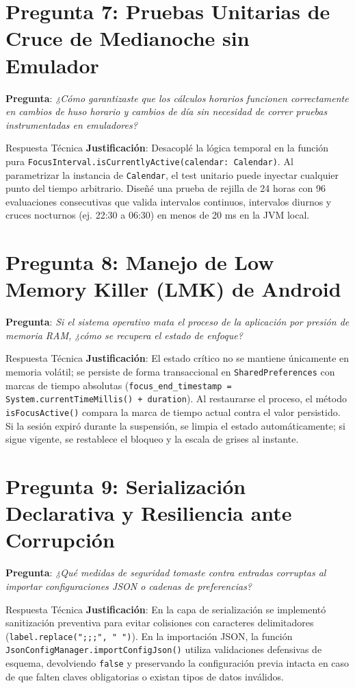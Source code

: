 \documentclass[11pt,a4paper,oneside]{report}
\begin{document}
\section{Pregunta 7: Pruebas Unitarias de Cruce de Medianoche sin Emulador}
\textbf{Pregunta}: \textit{¿Cómo garantizaste que los cálculos horarios funcionen correctamente en cambios de huso horario y cambios de día sin necesidad de correr pruebas instrumentadas en emuladores?}
\begin{starbox}{Respuesta Técnica}
\textbf{Justificación}: Desacoplé la lógica temporal en la función pura \texttt{FocusInterval.isCurrentlyActive(calendar: Calendar)}. Al parametrizar la instancia de \texttt{Calendar}, el test unitario puede inyectar cualquier punto del tiempo arbitrario. Diseñé una prueba de rejilla de 24 horas con 96 evaluaciones consecutivas que valida intervalos continuos, intervalos diurnos y cruces nocturnos (ej. 22:30 a 06:30) en menos de 20 ms en la JVM local.
\end{starbox}

\section{Pregunta 8: Manejo de Low Memory Killer (LMK) de Android}
\textbf{Pregunta}: \textit{Si el sistema operativo mata el proceso de la aplicación por presión de memoria RAM, ¿cómo se recupera el estado de enfoque?}
\begin{starbox}{Respuesta Técnica}
\textbf{Justificación}: El estado crítico no se mantiene únicamente en memoria volátil; se persiste de forma transaccional en \texttt{SharedPreferences} con marcas de tiempo absolutas (\texttt{focus\_end\_timestamp = System.currentTimeMillis() + duration}). Al restaurarse el proceso, el método \texttt{isFocusActive()} compara la marca de tiempo actual contra el valor persistido. Si la sesión expiró durante la suspensión, se limpia el estado automáticamente; si sigue vigente, se restablece el bloqueo y la escala de grises al instante.
\end{starbox}

\section{Pregunta 9: Serialización Declarativa y Resiliencia ante Corrupción}
\textbf{Pregunta}: \textit{¿Qué medidas de seguridad tomaste contra entradas corruptas al importar configuraciones JSON o cadenas de preferencias?}
\begin{starbox}{Respuesta Técnica}
\textbf{Justificación}: En la capa de serialización se implementó sanitización preventiva para evitar colisiones con caracteres delimitadores (\texttt{label.replace(";;;", " ")}). En la importación JSON, la función \texttt{JsonConfigManager.importConfigJson()} utiliza validaciones defensivas de esquema, devolviendo \texttt{false} y preservando la configuración previa intacta en caso de que falten claves obligatorias o existan tipos de datos inválidos.
\end{starbox}
\end{document}
